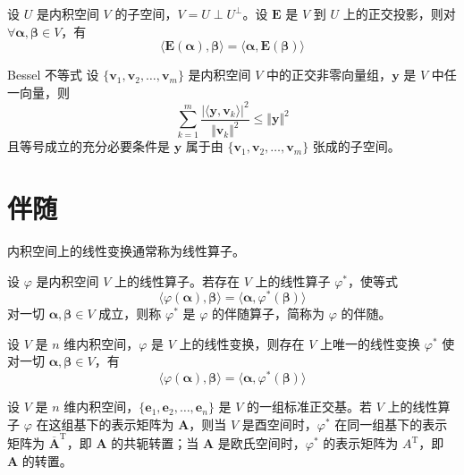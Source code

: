 \begin{proposition}
    设 $U$ 是内积空间 $V$ 的子空间，$V = U \perp U^{\perp}$。设 $\bm{E}$ 是 $V$ 到 $U$ 上的正交投影，则对 $\forall \bm{\alpha}, \bm{\beta} \in V$，有
    \[
        \langle \bm{E}(\bm{\alpha}), \bm{\beta} \rangle = \langle \bm{\alpha}, \bm{E}({\bm{\beta}}) \rangle
    \]
\end{proposition}

\begin{proposition}{Bessel 不等式}
    设 $\{\bm{v}_1, \bm{v}_2, \ldots,\bm{v}_m\}$ 是内积空间 $V$ 中的正交非零向量组，$\bm{y}$ 是 $V$ 中任一向量，则
    \[
        \sum_{k = 1}^{m}\frac{{\vert \langle \bm{y}, \bm{v}_k \rangle \vert}^2}{{\Vert \bm{v}_k \Vert}^2} \leqslant {\Vert \bm{y} \Vert}^2
    \]
    且等号成立的充分必要条件是 $\bm{y}$ 属于由 $\{\bm{v}_1, \bm{v}_2, \ldots,\bm{v}_m\}$ 张成的子空间。
\end{proposition}


\section{伴随}

内积空间上的线性变换通常称为线性算子。

\begin{definition}
  设 $\varphi$ 是内积空间 $V$ 上的线性算子。若存在 $V$ 上的线性算子 $\varphi^*$，使等式
  \[
      \langle \varphi(\bm{\alpha}), \bm{\beta} \rangle = \langle \bm{\alpha}, \varphi^{*}(\bm{\beta}) \rangle
  \]
  对一切 $\bm{\alpha}, \bm{\beta} \in V$ 成立，则称 $\varphi^*$ 是 $\varphi$ 的伴随算子，简称为 $\varphi$ 的伴随。
\end{definition}

\begin{theorem}
  设 $V$ 是 $n$ 维内积空间，$\varphi$ 是 $V$ 上的线性变换，则存在 $V$ 上唯一的线性变换 $\varphi^*$ 使对一切 $\bm{\alpha}, \bm{\beta} \in V$，有
  \[
      \langle \varphi(\bm{\alpha}), \bm{\beta} \rangle = \langle \bm{\alpha}, \varphi^{*}(\bm{\beta}) \rangle
  \]
\end{theorem}

\begin{theorem}
  设 $V$ 是 $n$ 维内积空间，$\{\bm{e}_{1}, \bm{e}_{2}, \ldots, \bm{e}_{n}\}$ 是 $V$ 的一组标准正交基。若 $V$ 上的线性算子 $\varphi$ 在这组基下的表示矩阵为 $\bm{A}$，则当 $V$ 是酉空间时，$\varphi^*$ 在同一组基下的表示矩阵为 $\overline{\bm{A}}^{\mathrm{T}}$，即 $\bm{A}$ 的共轭转置；当 $\bm{A}$ 是欧氏空间时，$\varphi^*$ 的表示矩阵为 $A^{\mathrm{T}}$，即 $\bm{A}$ 的转置。
\end{theorem}

